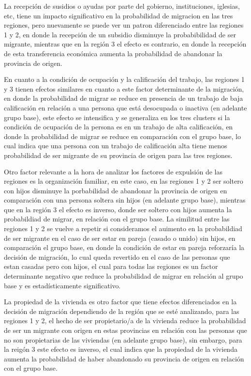 \documentclass[12pt,a4paper]{article}
\begin{document}
La recepción de susidios o ayudas por parte del gobierno, instituciones, iglesias, etc, tiene un impacto significativo en la probabilidad de migracion en las tres regiones, pero nuevamente se puede ver un patron diferenciado entre las regiones 1 y 2, en donde la recepción de un subsidio disminuye la probabibilidad de ser migrante, mientras que en la región 3 el efecto es contrario, en donde la recepción de esta transferencia económica aumenta la probabilidad de abandonar la provincia de origen.

En cuanto a la condición de ocupación y la calificación del trabajo, las regiones 1 y 3 tienen efectos similares en cuanto a este factor determinante de la migración, en donde la probabilidad de migrar se reduce en presencia de un trabajo de baja calificación en relación a una persona que está desocupada o inactiva (en adelante grupo base), este efecto se intensifica y se generaliza en los tres clusters si la condición de ocupación de la persona es en un trabajo de alta calificación, en donde la probabilidad de migrar se reduce en comparación con el grupo base, lo cual indica que una persona con un trabajo de calificación alta tiene menos probabilidad de ser migrante de su provincia de origen para las tres regiones.

Otro factor relevante a la hora de analizar los factores de expulsión de las regiones es la organización familiar, en este caso, en las regiones 1 y 2 ser soltero con hijos disminuye la porbabilidad de abandonar la provincia de origen en comparación con una persona soltera sin hijos (en adelante grupo base), mientras que en la región 3 el efecto es inverso, donde ser soltero con hijos aumenta la probabildiad de migrar, en relación con el grupo base.
La similitud entre las regiones 1 y 2 se vuelve a repetir si consideramos el auimento en la probabildiad de ser migrante en el caso de ser estar en pareja (casado o unido) sin hijos, en comparación el grupo base, en donde la condición de estar en pareja reforzaría la decisión de migración, lo cual queda revertido en el caso de las personas que estan casadas pero con hijos, el cual para todas las regiones es un factor determinante negativo que reduce la probabilidad de migrar en relación al grupo base y es estadísticamente significativo.

La propiedad de la vivienda es otro factor que tiene efectos diferenciados en la decisión de migración dependiendo de la región que se esté analizando, para las regiones 1 y 2, el hecho de ser propietario/a de la vivienda reduce la probabilidad de ser un migrante con origen en estas provincias en relación con las personas que no son propietarias de las viviendas (en adelante grupo base), sin embargo, para la reigón 3 este efecto es inverso, el cual indica que la propiedad de la vivienda aumenta la probabilidad de haber abandonado su provincia de origen en relación con el grupo base.
\end{document}
